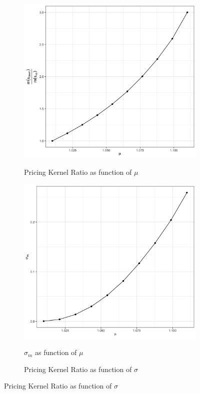 \documentclass[11pt]{article}
\begin{document}
\begin{enumerate}
\begin{enumerate}
			\newpage
			\begin{figure}[!hbt]
				\caption{}
				\begin{subfigure}{.5\textwidth}
					\centering
					\caption{Pricing Kernel Ratio as function of $\mu$}
					\includegraphics[width=.8\linewidth]{q5_fig1}
					\label{fig1_a}
				\end{subfigure}%
				\begin{subfigure}{.5\textwidth}
					\centering
					\caption{$\sigma_m$ as function of $\mu$}
					\includegraphics[width=.8\linewidth]{q5_fig2}
					\label{fig1_b}
				\end{subfigure}
				\begin{subfigure}{.5\textwidth}
					\centering
					\caption{Pricing Kernel Ratio as function of $\sigma$}

\end{subfigure}
\end{figure}
\end{enumerate}
\end{enumerate}
\end{document}
